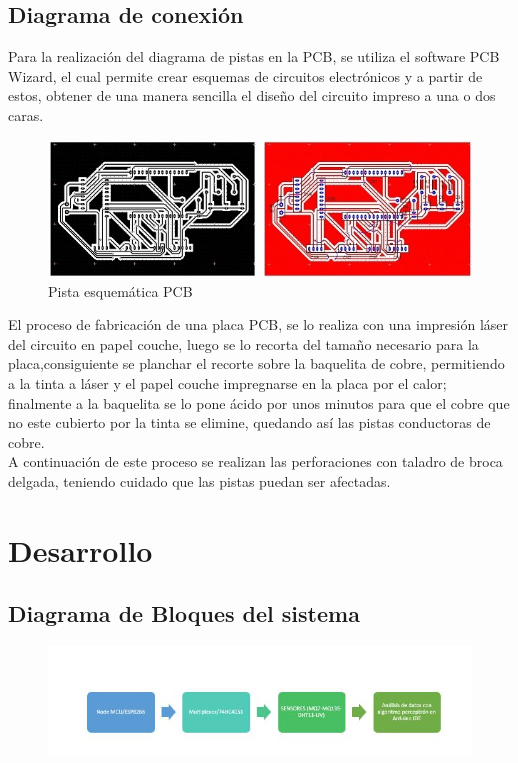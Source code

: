 \documentclass[10pt,a4paper]{article}
\begin{document}
\subsection{Diagrama de conexión }

Para la realización del diagrama de pistas en la PCB, se utiliza el software PCB Wizard, el cual permite crear esquemas de circuitos electrónicos y a partir de estos, obtener de una manera sencilla el diseño del circuito impreso a una o dos caras.

\begin{figure}[H]
\centering
 \includegraphics[scale=0.68]{placasensores.JPG} 
\caption{Pista esquemática PCB} 
\end{figure}

El proceso de fabricación de una placa PCB, se lo realiza con una impresión láser del circuito en papel couche, luego se lo recorta del tamaño necesario para la placa,consiguiente se planchar el recorte sobre la baquelita de cobre, permitiendo a la tinta a láser y el papel couche impregnarse en la placa por el calor; finalmente a la baquelita se lo pone ácido por unos minutos para que el cobre que no este cubierto por la tinta se elimine, quedando así las pistas conductoras de cobre. \\
A continuación de este proceso se realizan las perforaciones con taladro de broca delgada, teniendo cuidado que las pistas puedan ser afectadas.\\


\section{Desarrollo}

\subsection{Diagrama de Bloques del sistema}

\begin{figure}[H]
\centering
 \includegraphics[scale=0.88]{bloques.JPG} 
\end{figure}
\end{document}
